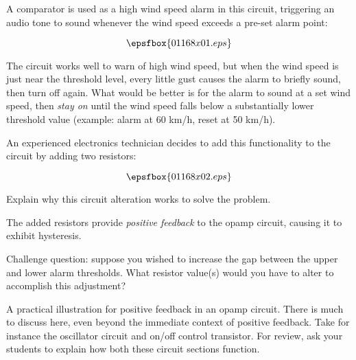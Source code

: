 

A comparator is used as a high wind speed alarm in this circuit, triggering an audio tone to sound whenever the wind speed exceeds a pre-set alarm point:

$$\epsfbox{01168x01.eps}$$

The circuit works well to warn of high wind speed, but when the wind speed is just near the threshold level, every little gust causes the alarm to briefly sound, then turn off again.  What would be better is for the alarm to sound at a set wind speed, then {\it stay on} until the wind speed falls below a substantially lower threshold value (example: alarm at 60 km/h, reset at 50 km/h).

An experienced electronics technician decides to add this functionality to the circuit by adding two resistors:

$$\epsfbox{01168x02.eps}$$

Explain why this circuit alteration works to solve the problem.







The added resistors provide {\it positive feedback} to the opamp circuit, causing it to exhibit hysteresis.

\vskip 10pt

Challenge question: suppose you wished to increase the gap between the upper and lower alarm thresholds.  What resistor value(s) would you have to alter to accomplish this adjustment?







A practical illustration for positive feedback in an opamp circuit.  There is much to discuss here, even beyond the immediate context of positive feedback.  Take for instance the oscillator circuit and on/off control transistor.  For review, ask your students to explain how both these circuit sections function.




